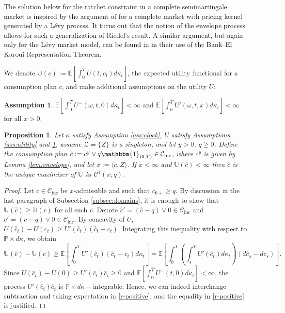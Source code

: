 \documentclass[11pt, oneside]{article}   	%
\theoremstyle{plain}
\newtheorem{prop}[thm]{Proposition}
\theoremstyle{definition}
\newtheorem{assume}[thm]{Assumption}
\theoremstyle{remark}
\begin{document}
\begin{appendix}
The solution below for the ratchet constraint in a complete semimartingale market is inspired by the argument of \cite{riedel} for a complete market with pricing kernel generated by a L\'evy process. It turns out that the notion of the envelope process allows for such a generalization of Riedel's result. A similar argument, but again only for the L\'evy market model, can be found in \cite{Watson-Scott} in their use of the Bank--El Karoui Representation Theorem.

We denote $\mathbb{U}(c):=\mathbb{E}\left[\int_0^{\hat{T}} U(t,c_t)d\kappa_t\right]$, the expected utility functional for a consumption plan $c$, and make additional assumptions on the utility $U$:
\begin{assume}\label{ass:utility-additional}
$\mathbb{E}\left[\int_0^{\hat{T}}U^{-}(\omega,t,0)d\kappa_t\right]<\infty$ and $\mathbb{E}\left[\int_0^{\hat{T}}U'(\omega,t,x)d\kappa_t\right]<\infty$ for all $x>0$.
\end{assume}


\begin{prop}\label{prop:alternative-sol}
Let $\kappa$ satisfy Assumption \ref{ass:clock}, $U$ satisfy Assumptions \ref{ass:utility} and \ref{ass:utility-additional}, assume $\mathcal{Z}=\{Z\}$ is a singleton, and let $y>0$, $q\geq 0$. Define the consumption plan $\hat{c}:=c^y\vee q\mathbbm{1}_{(0,\hat{T})}\in\mathcal{C}_\text{inc}$, where $c^y$ is given by Lemma \ref{lem:envelope}, and let $x:=\langle\hat{c},Z\rangle$. If $x<\infty$ and $\mathbb{U}(\hat{c})<\infty$ then $\hat{c}$ is the unique maximizer of $\mathbb{U}$ in $\mathcal{C}^1(x,q)$.
\end{prop}

\begin{proof}
Let $c\in\mathcal{C}_{\text{inc}}$ be $x$-admissible and such that $c_{0+}\geq q$. By discussion in the last paragraph of Subsection \ref{subsec:domains}, it is enough to show that $\mathbb{U}(\hat{c})\geq \mathbb{U}(c)$ for all such $c$. Denote $\hat{c}'=(\hat{c}-q)\vee 0\in\mathcal{C}_{\text{inc}}$ and $c'=(c-q)\vee 0\in\mathcal{C}_\text{inc}$. By concavity of $U$, $U(\hat{c}_t)-U(c_t)\geq U'(\hat{c}_t)(\hat{c}_t-c_t)$. Integrating this inequality with respect to $\mathbb{P}\times d\kappa$, we obtain
\begin{equation}\label{r-positive}
\mathbb{U}(\hat{c})-\mathbb{U}(c)\geq \mathbb{E}\left[\int_0^{\hat{T}} U'(\hat{c}_t)(\hat{c}_t-c_t)d\kappa_t\right]=\mathbb{E}\left[\int_0^{\hat{T}} \left(\int_s^{\hat{T}} U'(\hat{c}_t)d\kappa_t\right)(d\hat{c}_s-dc_s)\right].
\end{equation}
Since $U(\hat{c}_t)-U(0)\geq U'(\hat{c}_t)\hat{c}_t\geq 0$ and $\mathbb{E}\left[\int_0^{\hat{T}}U^{-}(t,0)d\kappa_t\right]<\infty$, the process $U'(\hat{c}_t)\hat{c}_t$ is $\mathbb{P}\times d\kappa-$integrable. Hence, we can indeed interchange subtraction and taking expectation in \eqref{r-positive}, and the equality in \eqref{r-positive} is justified.


\end{proof}
\end{appendix}
\end{document}
